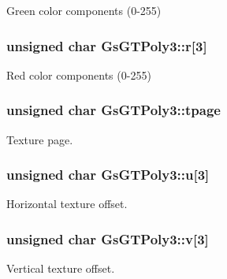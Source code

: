 Green color components (0-\/255) 

\hypertarget{structGsGTPoly3_a1869eeb590a6ed85a2e1953e6f17974e}{}
\subsubsection[{r}]{\setlength{\rightskip}{0pt plus 5cm}unsigned char Gs\+G\+T\+Poly3\+::r\mbox{[}3\mbox{]}}\label{structGsGTPoly3_a1869eeb590a6ed85a2e1953e6f17974e}


Red color components (0-\/255) 

\hypertarget{structGsGTPoly3_ae9f3507974206172e48621b837b7f0c7}{}
\subsubsection[{tpage}]{\setlength{\rightskip}{0pt plus 5cm}unsigned char Gs\+G\+T\+Poly3\+::tpage}\label{structGsGTPoly3_ae9f3507974206172e48621b837b7f0c7}


Texture page. 

\hypertarget{structGsGTPoly3_ac72eba19e1f30004e1fc469b59926236}{}
\subsubsection[{u}]{\setlength{\rightskip}{0pt plus 5cm}unsigned char Gs\+G\+T\+Poly3\+::u\mbox{[}3\mbox{]}}\label{structGsGTPoly3_ac72eba19e1f30004e1fc469b59926236}


Horizontal texture offset. 

\hypertarget{structGsGTPoly3_a1a9b6fe80157c16a3848ae5ea9aaa0d7}{}
\subsubsection[{v}]{\setlength{\rightskip}{0pt plus 5cm}unsigned char Gs\+G\+T\+Poly3\+::v\mbox{[}3\mbox{]}}\label{structGsGTPoly3_a1a9b6fe80157c16a3848ae5ea9aaa0d7}


Vertical texture offset. 

\hypertarget{structGsGTPoly3_ae3714403a39ee1e80b370b998ec83b29}{}
